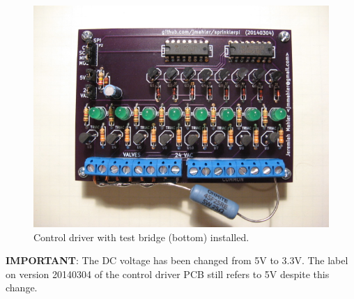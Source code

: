 \documentclass{article}
\begin{document}
\begin{figure}[htbp!]
\begin{center}
\includegraphics[scale=0.6]{img/control_driver_tb_02.jpg}
\end{center}
\caption{Control driver with test bridge (bottom) installed.}
\label{fig:cdbridge}
\end{figure}

\begin{framed}
\textbf{IMPORTANT}: The DC voltage has been changed
from 5V to 3.3V.
The label on version 20140304 of the control driver PCB still
refers to 5V despite this change.
\end{framed}
\end{document}
